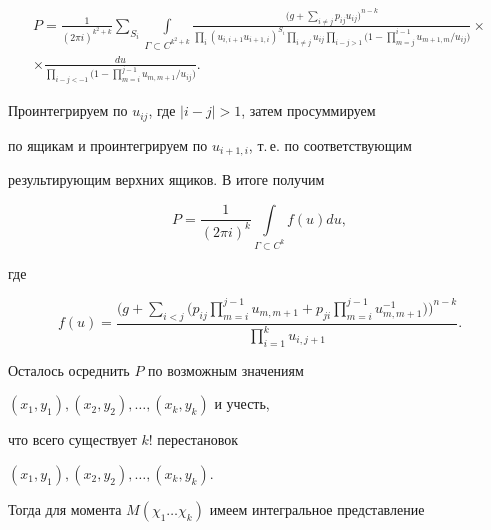 \begin{multline*}


P = \frac{1}{(2 \pi i)^{k^2+k}}\sum_{S_i}


\int\limits_{\Gamma \subset C^{k^2+k}}


\frac{


\Big( g+\sum\limits_{i \neq j} p_{ij} u_{ij}\Big)^{n-k}}


{


\prod\limits_i (u_{i,i+1}u_{i+1,i})^{S_i}


\prod\limits_{i\neq j} u_{ij} \prod\limits_{i-j>1}


\Big(1- \prod\limits^{i-1}_{m=j} u_{m+1,m}/u_{ij}\Big)} \times \\


%


\times \frac{


du}{\prod\limits_{i-j<-1}\Big(1-


\prod\limits^{j-1}_{m=i}u_{m,m+1}/u_{ij}\Big)}.


\end{multline*}


Проинтегрируем по $u_{ij}$, где $| i-j | >1$, затем просуммируем


по ящикам и проинтегрируем по $u_{i+1,i}$, т.\,е. по соответствующим


результирующим верхних ящиков. В итоге получим


$$


P=\frac{1}{(2 \pi i)^k}


\int\limits_{\Gamma \subset C^k}f(u) du,


$$


где


$$


f(u) = \frac{\bigg(g + \sum\limits_{i<j} \Big(p_{ij}\prod\limits_


{m=i}^{j-1} u_{m,m+1}+p_{ji}\prod\limits_{m=i}^{j-1}


u_{m,m+1}^{-1}\Big)\bigg)^{n-k}


}


{\prod\limits_{i=1}^k u_{i,j+1}}.


$$


Осталось осреднить $P$ по возможным значениям


$(x_1,y_1),(x_2,y_2),\dotsc , (x_k,y_k)$ и учесть,


что всего существует $k!$ перестановок


$(x_1,y_1), (x_2,y_2),\dotsc , (x_k,y_k)$.


Тогда для момента $M(\chi_1\dotsc\chi_k)$ имеем интегральное представление


